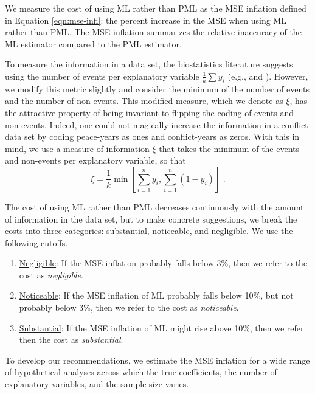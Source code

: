 \documentclass[12pt]{article}
\begin{document}
We measure the cost of using ML rather than PML as the MSE inflation defined in Equation \ref{eqn:mse-infl}: the percent increase in the MSE when using ML rather than PML. 
The MSE inflation summarizes the relative inaccuracy of the ML estimator compared to the PML estimator.

To measure the information in a data set, the biostatistics literature suggests using the number of events per explanatory variable $\frac{1}{k}\sum y_i$ (e.g., \citealt{Peduzzietal1996} and \citealt{VittinghoffMcCulloch2007}).
However, we modify this metric slightly and consider the minimum of the number of events and the number of non-events. 
This modified measure, which we denote as $\xi$, has the attractive property of being invariant to flipping the coding of events and non-events. 
Indeed, one could not magically increase the information in a conflict data set by coding peace-years as ones and conflict-years as zeros.
With this in mind, we use a measure of information $\xi$ that takes the minimum of the events and non-events per explanatory variable, so that
\begin{equation}
\xi = \frac{1}{k}\min \left[ \sum_{i = 1}^n y_i, \sum_{i = 1}^n(1 - y_i) \right]\text{ .}
\end{equation}

The cost of using ML rather than PML decreases continuously with the amount of information in the data set, but to make concrete suggestions, we break the costs into three categories: substantial, noticeable, and negligible.
We use the following cutoffs.
\begin{enumerate}
\item \underline{Negligible}: If the MSE inflation probably falls below 3\%, then we refer to the cost as \textit{negligible}.
\item \underline{Noticeable}: If the MSE inflation of ML probably falls below 10\%, but not probably below 3\%, then we refer to the cost as \textit{noticeable}.
\item \underline{Substantial}: If the MSE inflation of ML might rise above 10\%, then we refer then the cost as \textit{substantial}.
\end{enumerate}

To develop our recommendations, we estimate the MSE inflation for a wide range of hypothetical analyses across which the true coefficients, the number of explanatory variables, and the sample size varies. 
\end{document}
